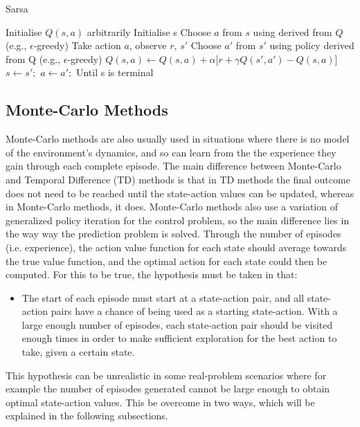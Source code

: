 \documentclass[11pt]{article}
\begin{document}
\begin{algorithm}
\caption{Sarsa}
\begin{algorithmic}[1]
\label{sarsa}
\STATE Initialise $Q(s,a)$ arbitrarily
\STATE Initialise s
\STATE Choose $a$ from $s$ using derived from $Q$ (e.g., $\epsilon$-greedy)
\STATE Take action $a$, observe $r$, $s'$
\STATE Choose $a'$ from $s'$ using policy derived from Q (e.g., $\epsilon$-greedy)
\STATE $Q(s,a) \leftarrow Q(s,a) + \alpha \lbrack r + \gamma Q(s',a') - Q(s,a)\rbrack$
\STATE $s \leftarrow s';$ $a \leftarrow a';$
\ENDFOR
\STATE Until s is terminal
\ENDFOR
\end{algorithmic}
\end{algorithm}



\subsection{Monte-Carlo Methods}
Monte-Carlo methods are also usually used in situations where there is no model of the environment's dynamics, and so can learn from the the experience they gain through each complete episode. The main difference between Monte-Carlo and Temporal Difference (TD) methods is that in TD methods the final outcome does not need to be reached until the state-action values can be updated, whereas in Monte-Carlo methods, it does. Monte-Carlo methods also use a variation of generalized policy iteration for the control problem, so the main difference lies in the way way the prediction problem is solved.
Through the number of episodes (i.e. experience), the action value function for each state should average towards the true value function, and the optimal action for each state could then be computed. For this to be true, the hypothesis must be taken in that:
\begin{itemize}
	\item The start of each episode must start at a state-action pair, and all state-action pairs have a chance of being used as a starting state-action. With a large enough number of episodes, each state-action pair should be visited enough times in order to make sufficient exploration for the best action to take, given a certain state. 
\end{itemize}
This hypothesis can be unrealistic in some real-problem scenarios where for example the number of episodes generated cannot be large enough to obtain optimal state-action values. This be overcome in two ways, which will be explained in the following subsections.
\end{document}
